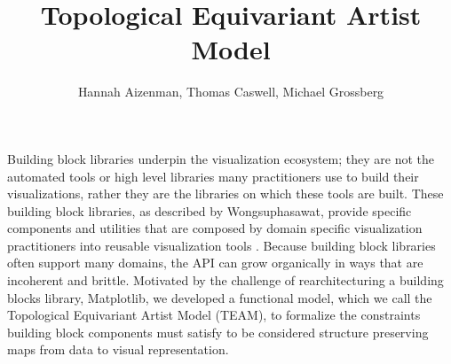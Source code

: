 \documentclass[journal]{vgtc}                %
\title{Topological Equivariant Artist Model}
\author{Hannah Aizenman, Thomas Caswell, Michael Grossberg}
\begin{document}
\linenumbers %

\maketitle

Building block libraries underpin the visualization ecosystem; they are not the automated tools or high level libraries many practitioners use to build their visualizations, rather they are the libraries on which these tools are built. These building block libraries, as described by Wongsuphasawat, provide specific components and utilities that are composed by domain specific visualization practitioners into reusable visualization tools \cite{wongsuphasawatNavigatingWideWorld2021}. Because building block libraries often support many domains, the API can grow organically in ways that are incoherent and brittle. Motivated by the challenge of rearchitecturing a building blocks library, Matplotlib\cite{hunterMatplotlib2DGraphics2007}, we developed a functional model, which we call the Topological Equivariant Artist Model (TEAM), to formalize the constraints building block components must satisfy to be considered structure preserving maps from data to visual representation.
\end{document}
